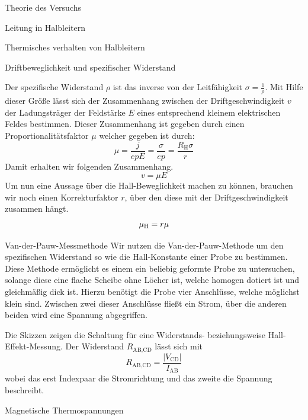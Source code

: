 \documentclass[pdftex, a4paper,11pt, twoside, ngerman]{report}
\newcommand\abs[1]{\left| #1 \right|}
\begin{document}
\begin{chapter}{Theorie des Versuchs}
\begin{section}{Leitung in Halbleitern}
\begin{subsection}{Thermisches verhalten von Halbleitern}
        \end{subsection}

        \begin{subsection}{Driftbeweglichkeit und spezifischer Widerstand}

            Der spezifische Widerstand $\rho$ ist das inverse von der Leitfähigkeit $\sigma = \frac 1\rho$.
            Mit Hilfe dieser Größe lässt sich der Zusammenhang zwischen der Driftgeschwindigkeit $v$ der Ladungsträger der Feldstärke $E$ eines entsprechend kleinem elektrischen Feldes bestimmen.
            Dieser Zusammenhang ist gegeben durch einen Proportionalitätsfaktor $\mu$ welcher gegeben ist durch:
            \[
                \mu = \frac j{epE} = \frac \sigma{ep} = \frac{R_\text{H} \sigma}r
            \]
            Damit erhalten wir folgenden Zusammenhang.
            \[
                v = \mu E
            \]
            Um nun eine Aussage über die Hall-Beweglichkeit machen zu können, brauchen wir noch einen Korrekturfaktor $r$, über den diese mit der Driftgeschwindigkeit zusammen hängt.
            \[
                \mu_\text H =r\mu
            \]

        \end{subsection}

        \begin{subsection}{Van-der-Pauw-Messmethode}
            Wir nutzen die Van-der-Pauw-Methode um den spezifischen Widerstand so wie die Hall-Konstante einer Probe zu bestimmen.
            Diese Methode ermöglicht es einem ein beliebig geformte Probe zu untersuchen, solange diese eine flache Scheibe ohne Löcher ist, welche homogen dotiert ist und gleichmäßig dick ist.
            Hierzu benötigt die Probe vier Anschlüsse, welche möglichst klein sind. 
            Zwischen zwei dieser Anschlüsse fließt ein Strom, über die anderen beiden wird eine Spannung abgegriffen.

            Die Skizzen zeigen die Schaltung für eine Widerstands- beziehungsweise Hall-Effekt-Messung.
            Der Widerstand $R_\text{AB,CD}$ lässt sich mit 
            \[
                R_\text{AB,CD} = \frac{\abs{V_\text{CD}}}{I_\text{AB}}
            \]
            wobei das erst Indexpaar die Stromrichtung und das zweite die Spannung beschreibt. 

        \end{subsection}

        \begin{subsection}{Magnetische Thermospannungen}


\end{subsection}
\end{section}
\end{chapter}
\end{document}
